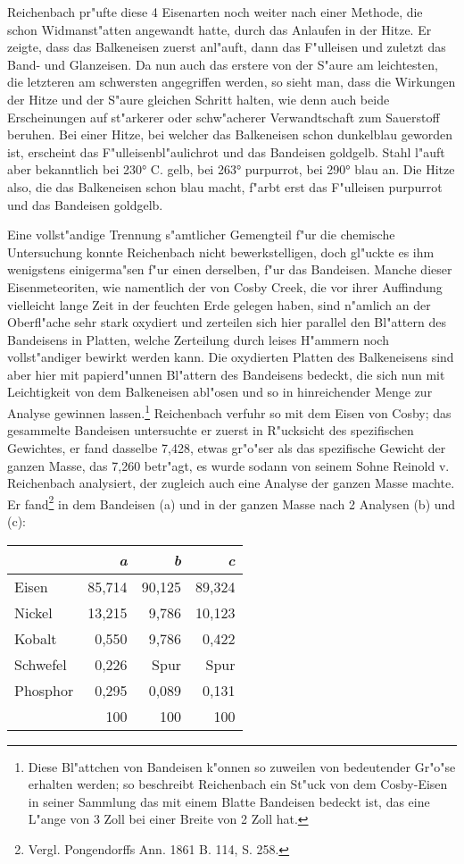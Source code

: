 \documentclass[a4paper, 11pt, oneside, german]{article}
\begin{document}
Reichenbach pr"ufte diese 4 Eisenarten noch weiter nach einer Methode, die schon Widmanst"atten angewandt hatte, durch das Anlaufen in der Hitze. Er zeigte, dass das Balkeneisen zuerst anl"auft, dann das F"ulleisen und zuletzt das Band- und Glanzeisen. Da nun auch das erstere von der S"aure am leichtesten, die letzteren am schwersten angegriffen werden, so sieht man, dass die Wirkungen der Hitze und der S"aure gleichen Schritt halten, wie denn auch beide Erscheinungen auf st"arkerer oder schw"acherer Verwandtschaft zum Sauerstoff beruhen. Bei einer Hitze, bei welcher das Balkeneisen schon dunkelblau geworden ist, erscheint das F"ulleisenbl"aulichrot und das Bandeisen goldgelb. Stahl l"auft aber bekanntlich bei 230° C. gelb, bei 263° purpurrot, bei 290° blau an. Die Hitze also, die das Balkeneisen schon blau macht, f"arbt erst das F"ulleisen purpurrot und das Bandeisen goldgelb.

Eine vollst"andige Trennung s"amtlicher Gemengteil f"ur die chemische Untersuchung konnte Reichenbach nicht bewerkstelligen, doch gl"uckte es ihm wenigstens einigerma"sen f"ur einen derselben, f"ur das Bandeisen. Manche dieser Eisenmeteoriten, wie namentlich der von Cosby Creek, die vor ihrer Auffindung vielleicht lange Zeit in der feuchten Erde gelegen haben, sind n"amlich an der Oberfl"ache sehr stark oxydiert und zerteilen sich hier parallel den Bl"attern des Bandeisens in Platten, welche Zerteilung durch leises H"ammern noch vollst"andiger bewirkt werden kann. Die oxydierten Platten des Balkeneisens sind aber hier mit papierd"unnen Bl"attern des Bandeisens bedeckt, die sich nun mit Leichtigkeit von dem Balkeneisen abl"osen und so in hinreichender Menge zur Analyse gewinnen lassen.\footnote{Diese Bl"attchen von Bandeisen k"onnen so zuweilen von bedeutender Gr"o"se erhalten werden; so beschreibt Reichenbach ein St"uck von dem Cosby-Eisen in seiner Sammlung das mit einem Blatte Bandeisen bedeckt ist, das eine L"ange von 3 Zoll bei einer Breite von 2 Zoll hat.} Reichenbach verfuhr so mit dem Eisen von Cosby; das gesammelte Bandeisen untersuchte er zuerst in R"ucksicht des spezifischen Gewichtes, er fand dasselbe 7,428, etwas gr"o"ser als das spezifische Gewicht der ganzen Masse, das 7,260 betr"agt, es wurde sodann von seinem Sohne Reinold v. Reichenbach analysiert, der zugleich auch eine Analyse der ganzen Masse machte. Er fand\footnote{Vergl. Pongendorffs Ann. 1861 B. 114, S. 258.} in dem Bandeisen (a) und in der ganzen Masse nach 2 Analysen (b) und (c):
\begin{center}
\begin{tabular}{ |l|r|r|r| }
    \hline
     & \emph{a} & \emph{b} & \emph{c}\\
    \hline\hline
    Eisen & 85,714 & 90,125 & 89,324\\\hline
    Nickel & 13,215 & 9,786 & 10,123\\\hline
    Kobalt & 0,550 & 9,786 & 0,422\\\hline
    Schwefel & 0,226 & Spur & Spur\\\hline
    Phosphor & 0,295 & 0,089 & 0,131\\\hline
     & 100 & 100 & 100\\
    \hline
\end{tabular}
\end{center}
\end{document}
